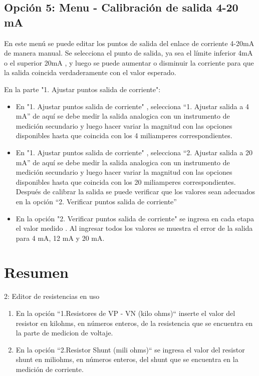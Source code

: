 \subsection{Opción 5: Menu - Calibración de salida 4-20 mA}

En este menú se puede editar los puntos de salida del enlace de corriente 4-20mA de manera manual. Se selecciona el punto de salida, ya sea el límite inferior 4mA o el superior 20mA , y luego se puede aumentar o disminuir la corriente para que la salida coincida verdaderamente con el valor esperado.

En la parte "1. Ajustar puntos salida de corriente":

\begin{itemize}
\item En "1. Ajustar puntos salida de corriente" , selecciona  “1.  Ajustar salida a 4 mA” de aquí se debe medir la salida analogica con un instrumento de medición secundario y luego hacer variar la magnitud con las opciones disponibles hasta que coincida con los 4 miliamperes correspondientes.

\item En "1. Ajustar puntos salida de corriente" , selecciona  “2. Ajustar salida a 20 mA” de aquí se debe medir la salida analogica con un instrumento de medición secundario y luego hacer variar la magnitud con las opciones disponibles hasta que coincida con los 20 miliamperes correspondientes.
Después de calibrar la salida se puede verificar que los valores sean adecuados en la opción “2. Verificar puntos salida de corriente”

\item En  la opción "2. Verificar puntos salida de corriente" se ingresa en cada etapa el valor medido . Al ingresar todos los valores se muestra el error de la salida para 4 mA, 12 mA y 20 mA.
\end{itemize}



\section{Resumen}
 
2: Editor de resistencias en uso
\begin{enumerate}
\item En la opción “1.Resistores de VP - VN (kilo ohms)“ inserte el valor del resistor en kilohms, en números enteros, de la resistencia que se encuentra en la parte de medicion de voltaje.
\item En la opción “2.Resistor Shunt (mili ohms)“ se ingresa el valor del resistor shunt en miliohms, en números enteros, del shunt que se encuentra en la medición de corriente.
\end{enumerate}


